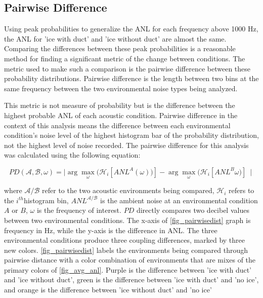 \subsection{Pairwise Difference} \label{sec_pairdiff}

Using peak probabilities to generalize the ANL for each frequency above 1000 Hz, the ANL for 'ice with duct' and 'ice without duct' are almost the same. Comparing the differences between these peak probabilities is a reasonable method for finding a significant metric of the change between conditions. The metric used to make such a comparison is the pairwise difference between these probability distributions. Pairwise difference is the length between two bins at the same frequency between the two environmental noise types being analyzed. 

This metric is not measure of probability but is the difference between the highest probable ANL of each acoustic condition. Pairwise difference in the context of this analysis means the difference between each environmental condition's noise level of the highest histogram bar of the probability distribution, not the highest level of noise recorded. The pairwise difference for this analysis was calculated using the following equation:

\begin{equation}
PD(\mathcal{A},\mathcal{B},\omega)=\mid \arg \max_{\omega} (\mathcal{H}_{i} [ANL ^{A}(\omega))]- \arg\max_{\omega}(\mathcal{H}_{i} [ANL^{B}\omega)]\ \mid 	%
\end{equation}

where $\mathcal{A/B}$ refer to the two acoustic environments being compared, $\mathcal{H}_{i}$ refers to the $i^{th}$histogram bin, $ANL^{\mathcal{A/B}}$ is the ambient noise at an environmental condition $A$ or $B$, $\omega$ is the frequency of interest. $PD$ directly compares two decibel values between two environmental conditions. The x-axis of \autoref{fig_pairwisedist} graph is frequency in Hz, while the y-axis is the difference in ANL. The three environmental conditions produce three coupling differences, marked by three new colors. \autoref{fig_pairwisedist} labels the environments being compared through pairwise distance with a color combination of environments that are mixes of the primary colors of \autoref{fig_avg_anl}. Purple is the difference between 'ice with duct' and 'ice without duct', green is the difference between 'ice with duct' and 'no ice', and orange is the difference between 'ice without duct' and 'no ice'

